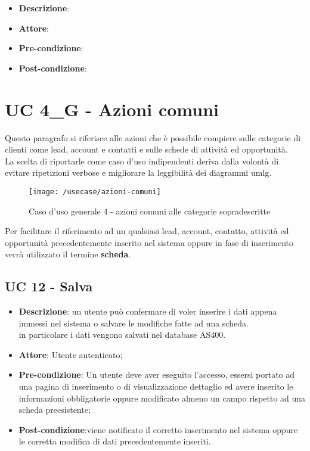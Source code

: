 \begin{itemize}
	\item \textbf{Descrizione}: %
	\item \textbf{Attore}: 
	\item \textbf{Pre-condizione}:
	\item \textbf{Post-condizione}:
\end{itemize}

\newpage

\section{UC 4\_G - Azioni comuni}

Questo paragrafo si riferisce alle azioni che è possibile compiere sulle categorie di clienti come lead, account e contatti e sulle schede di attività ed opportunità.\\
La scelta di riportarle come caso d'uso indipendenti deriva dalla volontà di evitare ripetizioni verbose e migliorare la leggibilità dei diagrammi \gls{umlg}.\\
\begin{figure}[h]
	\centering
	\texttt{[image: /usecase/azioni-comuni]}
	\caption{Caso d'uso generale 4 - azioni comuni alle categorie sopradescritte}
\end{figure}
Per facilitare il riferimento ad un qualsiasi lead, account, contatto, attività ed opportunità precedentemente inserito nel sistema oppure in fase di inserimento verrà utilizzato il termine \textbf{scheda}.
\subsection{UC 12 - Salva}

\begin{itemize}
	\item \textbf{Descrizione}: un utente può confermare di voler inserire i dati appena immessi nel sistema o salvare le modifiche fatte ad una scheda. \\
	 in particolare i dati vengono salvati nel database AS400.
	\item \textbf{Attore}: Utente autenticato;
	\item \textbf{Pre-condizione}: Un utente deve aver eseguito l'accesso, essersi portato ad una pagina di inserimento o di visualizzazione dettaglio ed avere inserito le informazioni obbligatorie oppure modificato almeno un campo rispetto ad una scheda preesistente;
	\item \textbf{Post-condizione}:viene notificato il corretto inserimento nel sistema oppure le corretta modifica di dati precedentemente inseriti.
\end{itemize}

